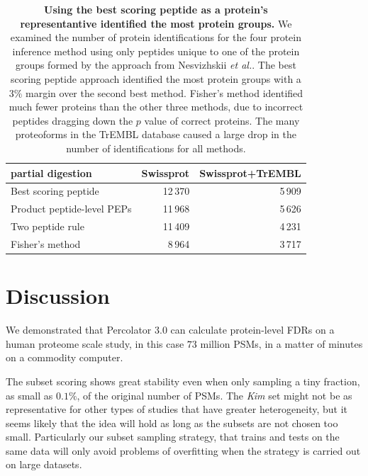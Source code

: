 \documentclass{article}
\begin{document}
\begin{table}[!htp]
  \begin{center}
    \begin{tabular}{|l|r|r|}
    \hline
    partial digestion & Swissprot & Swissprot+TrEMBL\\
    \hline
    Best scoring peptide & 12\,370 & 5\,909\\
    \hline
    Product peptide-level PEPs & 11\,968 & 5\,626\\
    \hline
    Two peptide rule & 11\,409 & 4\,231\\
    \hline
    Fisher's method & 8\,964 & 3\,717\\
    \hline
    \end{tabular}
  \end{center}
  \caption{\label{tab:pandey-stats}\textbf{Using the best scoring
peptide as a protein's representantive identified the most protein
groups.} We examined the number of protein identifications for the
four protein inference method using only peptides unique to one of
the protein groups formed by the approach from Nesvizhskii {\em et
al.}. The best scoring peptide approach identified the most protein
groups with a $3\%$ margin over the second best method. Fisher's
method identified much fewer proteins than the other three methods,
due to incorrect peptides dragging down the $p$ value of correct
proteins. The many proteoforms in the TrEMBL database caused a large
drop in the number of identifications for all methods.}
\end{table}

\section*{Discussion}

We demonstrated that Percolator 3.0 can calculate protein-level FDRs
on a human proteome scale study, in this case $73$ million PSMs, in a
matter of minutes on a commodity computer.

The subset scoring shows great stability even when only sampling a
tiny fraction, as small as $0.1\%$, of the original number of PSMs.
The {\em Kim} set might not be as representative for other types of
studies that have greater heterogeneity, but it seems likely that the
idea will hold as long as the subsets are not chosen too small.
Particularly our subset sampling strategy, that trains and tests on
the same data will only avoid problems of overfitting when the
strategy is carried out on large datasets.
\end{document}
